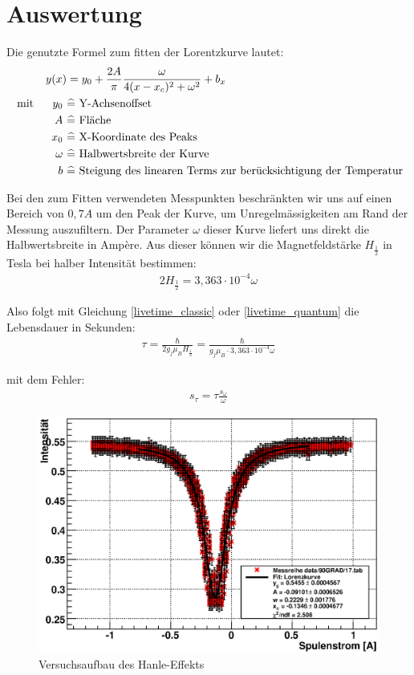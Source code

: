 \documentclass[12pt]{article}
\begin{document}
\section{Auswertung}
Die genutzte Formel zum fitten der Lorentzkurve lautet:
\begin{align}
 y(x) &= y_0+\frac{2A}{\pi}\frac{\omega}{4(x-x_c)^2+\omega^2}+b_x \\
\notag \textnormal{ mit }~~~~ y_0~&\widehat{=} \textnormal{ Y-Achsenoffset } \\
\notag A~ &\widehat{=} \textnormal{ Fläche } \\
\notag x_0~ &\widehat{=} \textnormal{ X-Koordinate des Peaks } \\
\notag \omega~ &\widehat{=} \textnormal{ Halbwertsbreite der Kurve } \\
\notag b~ &\widehat{=} \textnormal{ Steigung des linearen Terms zur berücksichtigung der Temperatur}
\end{align}

Bei den zum Fitten verwendeten Messpunkten beschränkten wir uns auf einen Bereich von $0,7A$ um den Peak der Kurve, um
Unregelmässigkeiten am Rand der Messung auszufiltern. Der Parameter $\omega$ dieser Kurve liefert uns direkt die
Halbwertsbreite in Ampère. Aus dieser können wir die Magnetfeldstärke $H_{\frac{1}{2}}$ in Tesla bei halber Intensität bestimmen:
\begin{align}
 2H_{\frac{1}{2}}= 3,363\cdot 10^{-4} \omega
\end{align}

Also folgt mit Gleichung \ref{livetime_classic} oder \ref{livetime_quantum} die Lebensdauer in Sekunden:
\begin{align}
 \tau = \frac{\hbar}{2g_j \mu_B H_{\frac{1}{2}}} = \frac{\hbar}{g_j \mu_B\cdot 3,363\cdot 10^{-4} \omega}
\end{align}

mit dem Fehler:
\begin{align}
 s_{\tau}=\tau \frac{s_{\omega}}{\omega}
\end{align}

\begin{figure}[H]  
\centering
\includegraphics[width=0.9\linewidth]{pictures/9017eps.eps}
\caption{Versuchsaufbau des Hanle-Effekts}
\end{figure}
\end{document}
